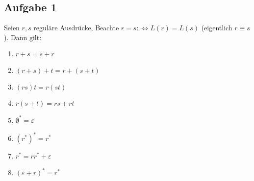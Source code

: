 \subsection{Aufgabe 1}
Seien $r,s$ reguläre Ausdrücke, Beachte $r=s:\Longleftrightarrow L(r)=L(s)$ (eigentlich $r\equiv s$). Dann gilt:
\begin{enumerate}[label=\alph*)]
	\item $r+s=s+r$
	\item $(r+s)+t=r+(s+t)$
	\item $(rs)t=r(st)$
	\item $r(s+t)=rs+rt$
	\item $\emptyset^\ast=\varepsilon$
	\item $(r^\ast)^\ast=r^\ast$
	\item $r^\ast=rr^\ast+\varepsilon$
	\item $(\varepsilon+r)^\ast=r^\ast$
\end{enumerate}

